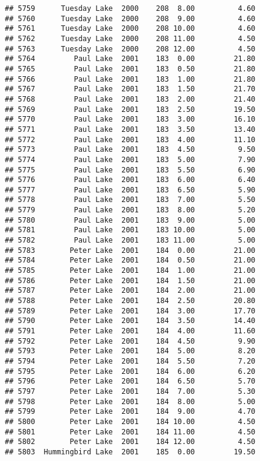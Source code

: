 \documentclass[
]{article}
\begin{document}
\begin{verbatim}
## 5759      Tuesday Lake  2000    208  8.00          4.60
## 5760      Tuesday Lake  2000    208  9.00          4.60
## 5761      Tuesday Lake  2000    208 10.00          4.60
## 5762      Tuesday Lake  2000    208 11.00          4.50
## 5763      Tuesday Lake  2000    208 12.00          4.50
## 5764         Paul Lake  2001    183  0.00         21.80
## 5765         Paul Lake  2001    183  0.50         21.80
## 5766         Paul Lake  2001    183  1.00         21.80
## 5767         Paul Lake  2001    183  1.50         21.70
## 5768         Paul Lake  2001    183  2.00         21.40
## 5769         Paul Lake  2001    183  2.50         19.50
## 5770         Paul Lake  2001    183  3.00         16.10
## 5771         Paul Lake  2001    183  3.50         13.40
## 5772         Paul Lake  2001    183  4.00         11.10
## 5773         Paul Lake  2001    183  4.50          9.50
## 5774         Paul Lake  2001    183  5.00          7.90
## 5775         Paul Lake  2001    183  5.50          6.90
## 5776         Paul Lake  2001    183  6.00          6.40
## 5777         Paul Lake  2001    183  6.50          5.90
## 5778         Paul Lake  2001    183  7.00          5.50
## 5779         Paul Lake  2001    183  8.00          5.20
## 5780         Paul Lake  2001    183  9.00          5.00
## 5781         Paul Lake  2001    183 10.00          5.00
## 5782         Paul Lake  2001    183 11.00          5.00
## 5783        Peter Lake  2001    184  0.00         21.00
## 5784        Peter Lake  2001    184  0.50         21.00
## 5785        Peter Lake  2001    184  1.00         21.00
## 5786        Peter Lake  2001    184  1.50         21.00
## 5787        Peter Lake  2001    184  2.00         21.00
## 5788        Peter Lake  2001    184  2.50         20.80
## 5789        Peter Lake  2001    184  3.00         17.70
## 5790        Peter Lake  2001    184  3.50         14.40
## 5791        Peter Lake  2001    184  4.00         11.60
## 5792        Peter Lake  2001    184  4.50          9.90
## 5793        Peter Lake  2001    184  5.00          8.20
## 5794        Peter Lake  2001    184  5.50          7.20
## 5795        Peter Lake  2001    184  6.00          6.20
## 5796        Peter Lake  2001    184  6.50          5.70
## 5797        Peter Lake  2001    184  7.00          5.30
## 5798        Peter Lake  2001    184  8.00          5.00
## 5799        Peter Lake  2001    184  9.00          4.70
## 5800        Peter Lake  2001    184 10.00          4.50
## 5801        Peter Lake  2001    184 11.00          4.50
## 5802        Peter Lake  2001    184 12.00          4.50
## 5803  Hummingbird Lake  2001    185  0.00         19.50

\end{verbatim}
\end{document}
